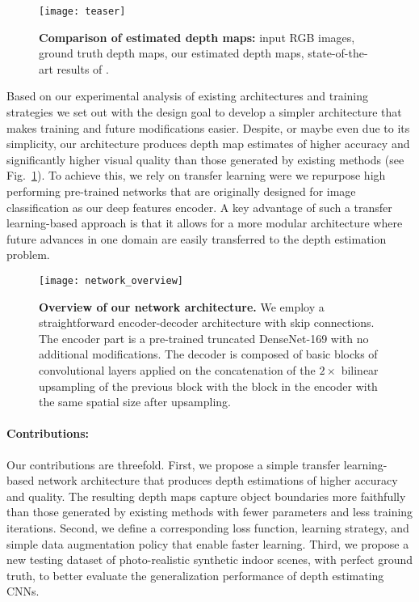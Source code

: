 \documentclass[10pt,twocolumn,letterpaper]{article}
\begin{document}
\begin{figure}[t]
\begin{center}
\texttt{[image: teaser]}
\end{center}
   \caption{\textbf{Comparison of estimated depth maps:} input RGB images, ground truth depth maps, our estimated depth maps, state-of-the-art results of \cite{Fu2018DeepOR}.}
\label{fig:teaser}
\end{figure}



Based on our experimental analysis of existing architectures and training strategies \cite{Eigen2014,Li2015,Laina2016,Xu2017,Fu2018DeepOR} we set out with the design goal to develop a simpler architecture that makes training and future modifications easier. Despite, or maybe even due to its simplicity, our architecture produces depth map estimates of higher accuracy and significantly higher visual quality than those generated by existing methods (see Fig.~\ref{fig:teaser}). To achieve this, we rely on transfer learning were we repurpose high performing pre-trained networks that are originally designed for image classification as our deep features encoder. A key advantage of such a transfer learning-based approach is that it allows for a more modular architecture where future advances in one domain are easily transferred to the depth estimation problem. 


\begin{figure*}
\begin{center}
\texttt{[image: network\_overview]}
\end{center}
   \caption{\textbf{Overview of our network architecture.} We employ a straightforward encoder-decoder architecture with skip connections. The encoder part is a pre-trained truncated DenseNet-169 \cite{huang2017densely} with no additional modifications. The decoder is composed of basic blocks of convolutional layers applied on the concatenation of the $2\times$ bilinear upsampling of the previous block with the block in the encoder with the same spatial size after upsampling. }
\label{fig:network_overview}
\end{figure*}



\paragraph{Contributions:} Our contributions are threefold. First, we propose a simple transfer learning-based network architecture that produces depth estimations of higher accuracy and quality. The resulting depth maps capture object boundaries more faithfully than those generated by existing methods with fewer parameters and less training iterations. Second, we define a corresponding loss function, learning strategy, and simple data augmentation policy that enable faster learning. Third, we propose a new testing dataset of photo-realistic synthetic indoor scenes, with perfect ground truth, to better evaluate the generalization performance of depth estimating CNNs.
\end{document}

